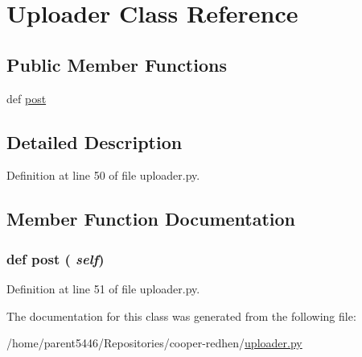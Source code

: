 \hypertarget{classuploader_1_1_uploader}{
\section{Uploader Class Reference}
\label{classuploader_1_1_uploader}
}
\subsection*{Public Member Functions}
\begin{DoxyCompactItemize}
\item 
def \hyperlink{classuploader_1_1_uploader_a49eef07c2e643292b02accabc4f0c182}{post}
\end{DoxyCompactItemize}


\subsection{Detailed Description}


Definition at line 50 of file uploader.py.

\subsection{Member Function Documentation}
\hypertarget{classuploader_1_1_uploader_a49eef07c2e643292b02accabc4f0c182}{
\subsubsection[{post}]{\setlength{\rightskip}{0pt plus 5cm}def post ( {\em self})}}
\label{classuploader_1_1_uploader_a49eef07c2e643292b02accabc4f0c182}


Definition at line 51 of file uploader.py.

The documentation for this class was generated from the following file:\begin{DoxyCompactItemize}
\item 
/home/parent5446/Repositories/cooper-\/redhen/\hyperlink{uploader_8py}{uploader.py}\end{DoxyCompactItemize}
